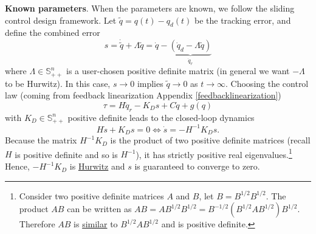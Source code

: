 \documentclass[
]{book}
\theoremstyle{definition}
\theoremstyle{definition}
\theoremstyle{definition}
\theoremstyle{definition}
\theoremstyle{remark}
\begin{document}
\textbf{Known parameters}. When the parameters are known, we follow the sliding control design framework. Let \(\tilde{q} = q(t) - q_d(t)\) be the tracking error, and define the combined error
\[
s = \dot{\tilde{q}} + \Lambda \tilde{q} = \dot{q} - \underbrace{\left( \dot{q}_d - \Lambda \tilde{q} \right)}_{\dot{q}_r}
\]
where \(\Lambda \in \mathbb{S}^n_{++}\) is a user-chosen positive definite matrix (in general we want \(-\Lambda\) to be Hurwitz). In this case, \(s \rightarrow 0\) implies \(\tilde{q} \rightarrow 0\) as \(t \rightarrow \infty\). Choosing the control law (coming from feedback linearization Appendix \ref{feedbacklinearization})
\begin{equation}
\tau = H \ddot{q}_r - K_D s + C \dot{q} + g(q)
\label{eq:ac-mrac-manipulator-controller-knownparam}
\end{equation}
with \(K_D \in \mathbb{S}^n_{++}\) positive definite leads to the closed-loop dynamics
\[
H \dot{s} + K_D s = 0 \Longleftrightarrow \dot{s} = - H^{-1} K_D s.
\]
Because the matrix \(H^{-1} K_D\) is the product of two positive definite matrices (recall \(H\) is positive definite and so is \(H^{-1}\)), it has strictly positive real eigenvalues.\footnote{Consider two positive definite matrices \(A\) and \(B\), let \(B = B^{1/2}B^{1/2}\). The product \(AB\) can be written as \(AB = A B^{1/2}B^{1/2} = B^{-1/2} (B^{1/2} A B^{1/2}) B^{1/2}\). Therefore \(AB\) is \href{https://en.wikipedia.org/wiki/Matrix_similarity}{similar} to \(B^{1/2} A B^{1/2}\) and is positive definite.} Hence, \(- H^{-1} K_D\) is \href{https://en.wikipedia.org/wiki/Hurwitz_matrix}{Hurwitz} and \(s\) is guaranteed to converge to zero.
\end{document}
